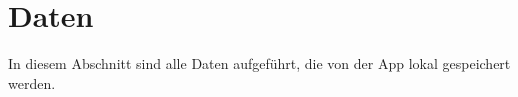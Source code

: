 \section{Daten}
In diesem Abschnitt sind alle Daten aufgeführt, die von der App lokal gespeichert werden.

